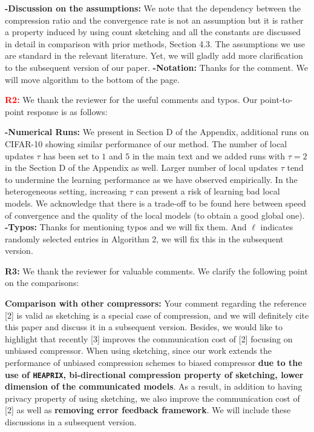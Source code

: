 \documentclass{article}
\begin{document}
\textbf{-Discussion on the assumptions:} We note that the dependency between the compression ratio and the convergence rate is not an assumption but it is rather a property induced by using count sketching and all the constants are discussed in detail in comparison with prior methods, Section 4.3. 
The assumptions we use are standard in the relevant literature. 
Yet, we will gladly add more clarification to the subsequent version of our paper. 
\textbf{-Notation:} Thanks for the comment. We will move algorithm to the bottom of the page.

\textbf{\textcolor{red}{R2:}} We thank the reviewer for the useful comments and typos. Our point-to-point response is as follows:\vspace{-5pt}

\textbf{-Numerical Runs:} We present in Section D of the Appendix, additional runs on CIFAR-10 showing similar performance of our method. The number of local updates $\tau$ has been set to $1$ and $5$ in the main text and we added runs with $\tau = 2$ in the Section D of the Appendix as well. Larger number of local updates $\tau$ tend to undermine the learning performance as we have observed empirically. In the heterogeneous setting, increasing $\tau$ can present a risk of learning bad local models. We acknowledge that there is a trade-off to be found here between speed of convergence and the quality of the local models (to obtain a good global one). \textbf{-Typos:} Thanks for mentioning typos and we will fix them. And $\ell$ indicates randomly selected entries in Algorithm 2, we will fix this in the subsequent version.  


\textbf{\textcolor{yellow!50!black}{R3:}} We thank the reviewer for valuable comments. We clarify the following point on the comparisons:\vspace{-5pt}

\textbf{Comparison with other compressors:} Your comment regarding the reference [2] is valid as sketching is a special case of compression, and we will definitely cite this paper and discuss it in a subsequent version. Besides, we would like to highlight that recently [3] improves the communication cost of [2] focusing on unbiased compressor. 
When using sketching, since our work extends the performance of unbiased compression schemes to biased compressor \textbf{due to the use of \texttt{HEAPRIX}, bi-directional compression property of sketching, lower dimension of the communicated models}.  
As a result, in addition to having privacy property of using sketching, we also improve the communication cost of [2] as well as \textbf{removing error feedback framework}. We will include these discussions in a subsequent version.    
\end{document}
